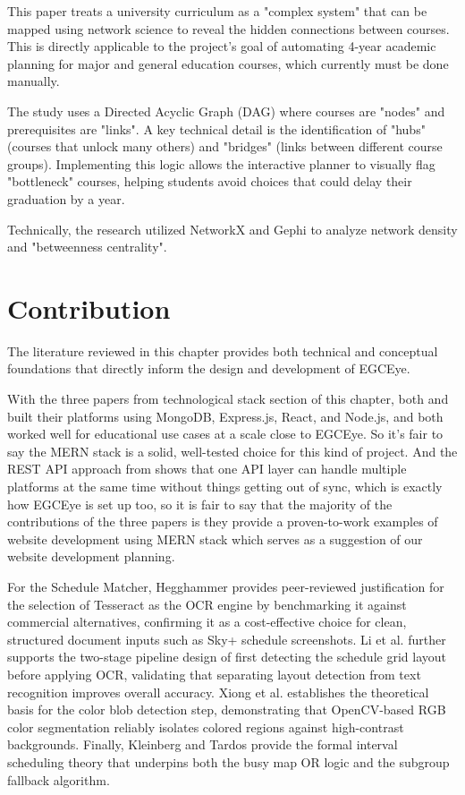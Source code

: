 This paper treats a university curriculum as a "complex system" that can be mapped using network science to reveal the hidden connections between courses. This is directly applicable to the project’s goal of automating 4-year academic planning for major and general education courses, which currently must be done manually.

The study uses a Directed Acyclic Graph (DAG) where courses are "nodes" and prerequisites are "links". A key technical detail is the identification of "hubs" (courses that unlock many others) and "bridges" (links between different course groups). Implementing this logic allows the interactive planner to visually flag "bottleneck" courses, helping students avoid choices that could delay their graduation by a year.

Technically, the research utilized NetworkX and Gephi to analyze network density and "betweenness centrality". 

\section{Contribution}

The literature reviewed in this chapter provides both technical and conceptual foundations that directly inform the design and development of EGCEye.

With the three papers from technological stack section of this chapter, both \cite{paper_11} and \cite{paper_12} built their platforms using MongoDB, Express.js, React, and Node.js, and both worked well for educational use cases at a scale close to EGCEye. So it's fair to say the MERN stack is a solid, well-tested choice for this kind of project. And the REST API approach from \cite{paper_10} shows that one API layer can handle multiple platforms at the same time without things getting out of sync, which is exactly how EGCEye is set up too, so it is fair to say that the majority of the contributions of the three papers is they provide a proven-to-work examples of website development using MERN stack which serves as a suggestion of our website development planning.

For the Schedule Matcher, Hegghammer \cite{paper_16} provides peer-reviewed justification for the selection of Tesseract as the OCR engine by benchmarking it against commercial alternatives, confirming it as a cost-effective choice for clean, structured document inputs such as Sky+ schedule screenshots. Li et al. \cite{paper_17} further supports the two-stage pipeline design of first detecting the schedule grid layout before applying OCR, validating that separating layout detection from text recognition improves overall accuracy. Xiong et al. \cite{paper_18} establishes the theoretical basis for the color blob detection step, demonstrating that OpenCV-based RGB color segmentation reliably isolates colored regions against high-contrast backgrounds. Finally, Kleinberg and Tardos \cite{kleinberg2005algorithm} provide the formal interval scheduling theory that underpins both the busy map OR logic and the subgroup fallback algorithm.

